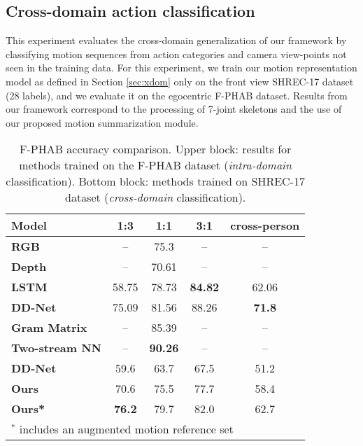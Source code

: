 \documentclass[letterpaper, 10 pt, conference]{ieeeconf}
\begin{document}
\subsection{Cross-domain action classification}
\label{sec:fphab_bench}

This experiment evaluates the cross-domain generalization of our framework by classifying motion sequences from action categories and camera view-points not seen in the training data. 
For this experiment, we train our motion representation model as defined in Section \ref{sec:xdom} only on the front view SHREC-17 dataset (28 labels), and we evaluate it on the egocentric F-PHAB dataset. Results from our framework correspond to the processing of 7-joint skeletons and the use of our proposed motion summarization module.

\begin{table}[!tb]
\centering
\begin{tabular}{|l|c|c|c|c|}
\hline
\textbf{Model} & \textbf{1:3} & \textbf{1:1} & \textbf{3:1} & \textbf{cross-person} \\ \hline
\textbf{RGB \cite{feichtenhofer2016convolutional}} & -- & 75.3 & -- & -- \\ \hline
\textbf{Depth \cite{oreifej2013hon4d}} & -- & 70.61 & -- & -- \\ \hline
\textbf{LSTM \cite{zhu2016co}} & 58.75 & 78.73 & \textbf{84.82} & 62.06 \\ \hline
\textbf{DD-Net \cite{yang2019make}} & 75.09 & 81.56 & 88.26 & \textbf{71.8} \\ \hline \textbf{Gram Matrix \cite{zhang2016efficient}} & -- & 85.39 & -- & -- \\ \hline
\textbf{Two-stream NN \cite{li2021two}} & -- & \textbf{90.26} & -- & -- \\ \hline\hline
\textbf{DD-Net \cite{yang2019make}} & 59.6 & 63.7 & 67.5 & 51.2 \\ \hline
\textbf{Ours} & 70.6 & 75.5 & 77.7 & 58.4 \\ \hline
\textbf{Ours*} & \textbf{76.2} & 79.7 & 82.0 & 62.7 \\ \hline
\multicolumn{5}{l}{\footnotesize \(^*\) includes an augmented motion reference set} \\
\end{tabular}
\caption{F-PHAB accuracy comparison. Upper block: results for methods trained on the F-PHAB dataset (\textit{intra-domain} classification). Bottom block: methods trained on SHREC-17 dataset (\textit{cross-domain} classification).}
\label{tab:phab_ablation}
\end{table}
\end{document}
